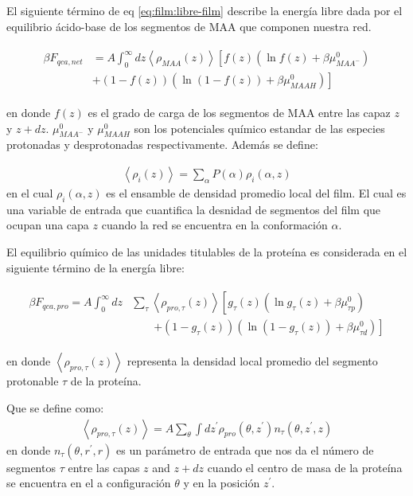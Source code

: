 El siguiente t\'ermino de eq \ref{eq:film:libre-film} describe  la energ\'ia libre dada por  el equilibrio \'acido-base de los segmentos de MAA que componen nuestra red. 

\begin{align}
	\begin{aligned}
		\beta F_{qca,net} &= A\int_0^\infty dz \left<\rho_{MAA}(z)\right> \left[f(z)(\ln f(z)+ \beta\mu^0_{MAA^-})\right.\\
		&\left.+(1-f(z))(\ln (1-f(z))+\beta\mu^0_{MAAH})\right]    
	\end{aligned}
\end{align} 

\noindent en donde $f(z)$ es el grado de carga de los segmentos de MAA entre las capaz $z$ y $z + dz$. 
$\mu^0_{MAA^-}$ y $\mu^0_{MAAH}$ son los potenciales qu\'imico estandar  de las especies protonadas y desprotonadas respectivamente.
Adem\'as se define:

\begin{align}
	\left< \rho_i(z)\right> = \sum_\alpha{P(\alpha)\rho_i(\alpha,z)}
\end{align}
\noindent en el cual $\rho_i(\alpha,z)$  es el ensamble de densidad  promedio local del film. El cual es una variable de entrada que cuantifica la desnidad de segmentos del film que  ocupan una capa $z$ cuando la red se encuentra en la conformaci\'on $\alpha$.


El equilibrio qu\'imico de las unidades titulables de la prote\'ina es considerada en el siguiente t\'ermino de la energ\'ia libre:

\begin{align}
	\begin{aligned}
		\beta F_{qca,pro} = A\int_0^\infty dz& \sum_\tau \left<\rho_{pro,\tau}(z)\right> \left[g_\tau(z)(\ln g_\tau(z)+ \beta\mu^0_{\tau p})\right.\\
		&\qquad\left.+(1-g_\tau(z))(\ln (1-g_\tau(z))+\beta\mu^0_{\tau d})\right]   
	\end{aligned}
\end{align} 

\noindent en donde $\left<\rho_{pro,\tau}(z)\right>$ representa la densidad local promedio del segmento protonable $\tau$ de la prote\'ina.

Que se define como:
\begin{align}
	\left<\rho_{pro,\tau}(z)\right> = A\sum_\theta \int dz^\prime  \rho_{pro}(\theta,z^\prime)n_\tau(\theta,z^\prime, z)
	\label{eq:film:segments_pro_si}
\end{align}
\noindent en donde $n_\tau(\theta,r^\prime, r)$ es un par\'ametro de entrada que nos da el n\'umero de segmentos $\tau$ entre las capas $z$ and $z+ dz$ cuando el centro de masa de la prote\'ina se encuentra en el a configuraci\'on $\theta$ y en la posici\'on $z^\prime$.

